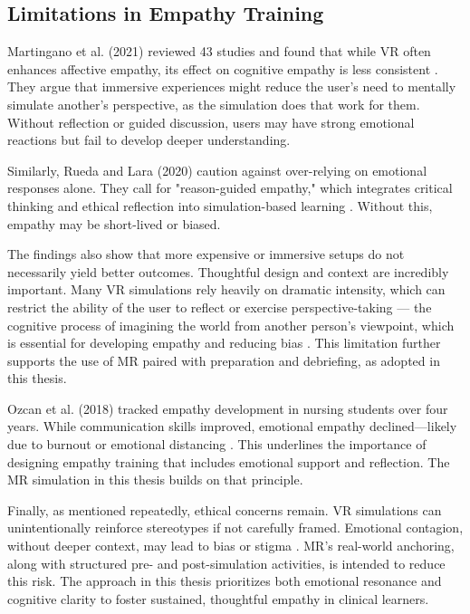 \subsection{Limitations in Empathy Training}

Martingano et al. (2021) reviewed 43 studies and found that while VR often enhances affective empathy, its effect on cognitive empathy is less consistent \cite{Martingano2021}. They argue that immersive experiences might reduce the user's need to mentally simulate another's perspective, as the simulation does that work for them. Without reflection or guided discussion, users may have strong emotional reactions but fail to develop deeper understanding.

Similarly, Rueda and Lara (2020) caution against over-relying on emotional responses alone. They call for "reason-guided empathy," which integrates critical thinking and ethical reflection into simulation-based learning \cite{Rueda2020}. Without this, empathy may be short-lived or biased.

The findings also show that more expensive or immersive setups do not necessarily yield better outcomes. Thoughtful design and context are incredibly important. Many VR simulations rely heavily on dramatic intensity, which can restrict the ability of the user to reflect or exercise perspective-taking — the cognitive process of imagining the world from another person’s viewpoint, which is essential for developing empathy and reducing bias \cite{Batson2009}. This limitation further supports the use of MR paired with preparation and debriefing, as adopted in this thesis.

Ozcan et al. (2018) tracked empathy development in nursing students over four years. While communication skills improved, emotional empathy declined—likely due to burnout or emotional distancing \cite{Ozcan2018}. This underlines the importance of designing empathy training that includes emotional support and reflection. The MR simulation in this thesis builds on that principle.

Finally, as mentioned repeatedly, ethical concerns remain. VR simulations can unintentionally reinforce stereotypes if not carefully framed. Emotional contagion, without deeper context, may lead to bias or stigma \cite{Rueda2020}. MR's real-world anchoring, along with structured pre- and post-simulation activities, is intended to reduce this risk. The approach in this thesis prioritizes both emotional resonance and cognitive clarity to foster sustained, thoughtful empathy in clinical learners.


